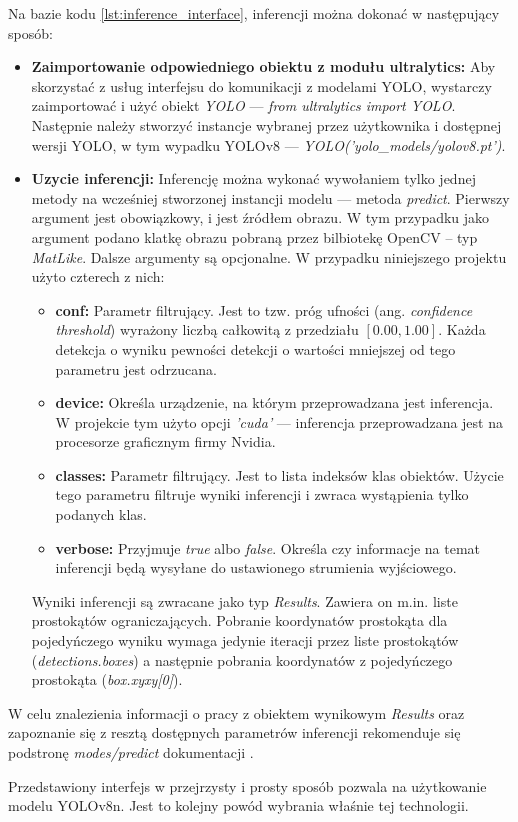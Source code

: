 Na bazie kodu \ref{lst:inference_interface}, inferencji można dokonać w następujący sposób:
\begin{itemize}
    \item \textbf{Zaimportowanie odpowiedniego obiektu z modułu ultralytics:} Aby skorzystać z usług interfejsu do komunikacji z modelami YOLO, wystarczy zaimportować i użyć obiekt \emph{YOLO} --- \emph{from ultralytics import YOLO}. Następnie należy stworzyć instancje wybranej przez użytkownika i dostępnej wersji YOLO, w tym wypadku YOLOv8 --- \emph{YOLO('yolo\_models/yolov8.pt')}.

    \item \textbf{Uzycie inferencji:} Inferencję można wykonać wywołaniem tylko jednej metody na wcześniej stworzonej instancji modelu --- metoda \emph{predict}. Pierwszy argument jest obowiązkowy, i jest źródłem obrazu. W tym przypadku jako argument podano klatkę obrazu pobraną przez bilbiotekę OpenCV -- typ \emph{MatLike}. Dalsze argumenty są opcjonalne. W przypadku niniejszego projektu użyto czterech z nich:
    \begin{itemize}
        \item \textbf{conf:} Parametr filtrujący. Jest to tzw. próg ufności (ang. \emph{confidence threshold}) wyrażony liczbą całkowitą z przedziału $[0.00, 1.00]$. Każda detekcja o wyniku pewności detekcji o wartości mniejszej od tego parametru jest odrzucana. 
        \item \textbf{device:} Określa urządzenie, na którym przeprowadzana jest inferencja. W projekcie tym użyto opcji \emph{'cuda'} --- inferencja przeprowadzana jest na procesorze graficznym firmy Nvidia.
        \item \textbf{classes:} Parametr filtrujący. Jest to lista indeksów klas obiektów. Użycie tego parametru filtruje wyniki inferencji i zwraca wystąpienia tylko podanych klas. 
        \item \textbf{verbose:} Przyjmuje \emph{true} albo \emph{false}. Określa czy informacje na temat inferencji będą wysyłane do ustawionego strumienia wyjściowego.
    \end{itemize}
    Wyniki inferencji są zwracane jako typ \emph{Results}. Zawiera on m.in. liste prostokątów ograniczających. Pobranie koordynatów prostokąta dla pojedyńczego wyniku wymaga jedynie iteracji przez liste prostokątów (\emph{detections.boxes}) a następnie pobrania koordynatów z pojedyńczego prostokąta (\emph{box.xyxy[0]}).
\end{itemize}

W celu znalezienia informacji o pracy z obiektem wynikowym \emph{Results} oraz zapoznanie się z resztą dostępnych parametrów inferencji rekomenduje się podstronę \emph{modes/predict} dokumentacji \cite{yolo_docs}.

Przedstawiony interfejs w przejrzysty i prosty sposób pozwala na użytkowanie modelu YOLOv8n. Jest to kolejny powód wybrania właśnie tej technologii.